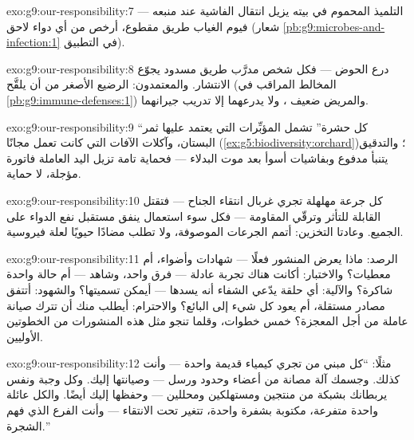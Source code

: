 \begin{solution}{exo:g9:our-responsibility:7}
التلميذ المحموم في بيته يزيل انتقال الفاشية عند منبعه ---
فيوم الغياب طريق مقطوع، أرخص من أي دواء لاحق (شعار
\cref{pb:g9:microbes-and-infection:1} في التطبيق).
\end{solution}

\begin{solution}{exo:g9:our-responsibility:8}
درع الحوض --- فكل شخص مدرَّب طريق مسدود يجوّع الانتشار.
والمعتمدون: الرضيع الأصغر من أن يلقَّح (المخالط المراقب
في \cref{pb:g9:immune-defenses:1}) والمريض ضعيف ،
ولا يدرعهما إلا تدريب جيرانهما.
\end{solution}

\begin{solution}{exo:g9:our-responsibility:9}
``كل حشرة'' تشمل المؤبِّرات التي يعتمد عليها ثمر
البستان، وآكلات الآفات التي كانت تعمل مجانًا
(\cref{ex:g5:biodiversity:orchard})؛ والتدقيق يتنبأ
 مدفوع وبفاشيات أسوأ بعد موت البدلاء --- فحماية
تامة تزيل اليد العاملة فاتورة مؤجلة، لا حماية.
\end{solution}

\begin{solution}{exo:g9:our-responsibility:10}
كل جرعة مهلهلة تجري غربال انتقاء الجناح --- فتقتل
القابلة للتأثر وترقّي المقاومة --- فكل سوء استعمال ينفق
مستقبل نفع الدواء على الجميع. وعادتا التخزين: أتمم
الجرعات الموصوفة، ولا تطلب مضادًا حيويًا لعلة فيروسية.
\end{solution}

\begin{solution}{exo:g9:our-responsibility:11}
الرصد: ماذا يعرض المنشور فعلًا --- شهادات وأضواء، أم
معطيات؟ والاختبار: أكانت هناك تجربة عادلة --- فرق واحد،
وشاهد --- أم حالة واحدة شاكرة؟ والآلية: أي حلقة يدّعي
الشفاء أنه يسدها --- أيمكن تسميتها؟ والشهود: أتتفق مصادر
مستقلة، أم يعود كل شيء إلى البائع؟ والاحترام: أيطلب منك
أن تترك صيانة عاملة من أجل المعجزة؟ خمس خطوات، وقلما
تنجو مثل هذه المنشورات من الخطوتين الأوليين.
\end{solution}

\begin{solution}{exo:g9:our-responsibility:12}
مثلًا: ``كل  مبني من  تجري كيمياء قديمة
واحدة --- وأنت كذلك. وجسمك آلة مصانة من أعضاء وحدود
ورسل --- وصيانتها إليك. وكل وجبة ونفس يربطانك بشبكة من
منتجين ومستهلكين ومحللين --- وحفظها إليك أيضًا. والكل
عائلة واحدة متفرعة، مكتوبة بشفرة واحدة، تتغير تحت
الانتقاء --- وأنت الفرع الذي فهم الشجرة.''
\end{solution}

